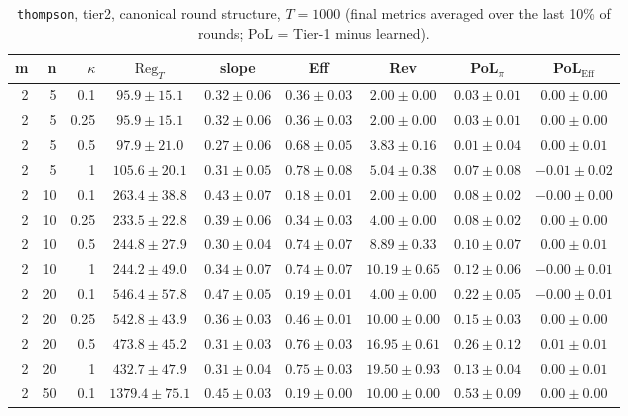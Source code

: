 \begin{table}[htbp]
\centering
\scriptsize
\caption{\texttt{thompson}, tier2, canonical round structure, $T=1000$ (final metrics averaged over the last 10\% of rounds; PoL = Tier-1 minus learned).}
\label{tab:tier2_thompson_canonical}
\begin{tabular}{@{}rrrcccccc@{}}
\toprule
m & n & $\kappa$ & $\mathrm{Reg}_T$ & slope & Eff & Rev & PoL$_\pi$ & PoL$_\mathrm{Eff}$ \\
\midrule
2 & 5 & 0.1 & $95.9 \pm 15.1$ & $0.32 \pm 0.06$ & $0.36 \pm 0.03$ & $2.00 \pm 0.00$ & $0.03 \pm 0.01$ & $0.00 \pm 0.00$ \\
2 & 5 & 0.25 & $95.9 \pm 15.1$ & $0.32 \pm 0.06$ & $0.36 \pm 0.03$ & $2.00 \pm 0.00$ & $0.03 \pm 0.01$ & $0.00 \pm 0.00$ \\
2 & 5 & 0.5 & $97.9 \pm 21.0$ & $0.27 \pm 0.06$ & $0.68 \pm 0.05$ & $3.83 \pm 0.16$ & $0.01 \pm 0.04$ & $0.00 \pm 0.01$ \\
2 & 5 & 1 & $105.6 \pm 20.1$ & $0.31 \pm 0.05$ & $0.78 \pm 0.08$ & $5.04 \pm 0.38$ & $0.07 \pm 0.08$ & $-0.01 \pm 0.02$ \\
2 & 10 & 0.1 & $263.4 \pm 38.8$ & $0.43 \pm 0.07$ & $0.18 \pm 0.01$ & $2.00 \pm 0.00$ & $0.08 \pm 0.02$ & $-0.00 \pm 0.00$ \\
2 & 10 & 0.25 & $233.5 \pm 22.8$ & $0.39 \pm 0.06$ & $0.34 \pm 0.03$ & $4.00 \pm 0.00$ & $0.08 \pm 0.02$ & $0.00 \pm 0.00$ \\
2 & 10 & 0.5 & $244.8 \pm 27.9$ & $0.30 \pm 0.04$ & $0.74 \pm 0.07$ & $8.89 \pm 0.33$ & $0.10 \pm 0.07$ & $0.00 \pm 0.01$ \\
2 & 10 & 1 & $244.2 \pm 49.0$ & $0.34 \pm 0.07$ & $0.74 \pm 0.07$ & $10.19 \pm 0.65$ & $0.12 \pm 0.06$ & $-0.00 \pm 0.01$ \\
2 & 20 & 0.1 & $546.4 \pm 57.8$ & $0.47 \pm 0.05$ & $0.19 \pm 0.01$ & $4.00 \pm 0.00$ & $0.22 \pm 0.05$ & $-0.00 \pm 0.01$ \\
2 & 20 & 0.25 & $542.8 \pm 43.9$ & $0.36 \pm 0.03$ & $0.46 \pm 0.01$ & $10.00 \pm 0.00$ & $0.15 \pm 0.03$ & $0.00 \pm 0.00$ \\
2 & 20 & 0.5 & $473.8 \pm 45.2$ & $0.31 \pm 0.03$ & $0.76 \pm 0.03$ & $16.95 \pm 0.61$ & $0.26 \pm 0.12$ & $0.01 \pm 0.01$ \\
2 & 20 & 1 & $432.7 \pm 47.9$ & $0.31 \pm 0.04$ & $0.75 \pm 0.03$ & $19.50 \pm 0.93$ & $0.13 \pm 0.04$ & $0.00 \pm 0.01$ \\
2 & 50 & 0.1 & $1379.4 \pm 75.1$ & $0.45 \pm 0.03$ & $0.19 \pm 0.00$ & $10.00 \pm 0.00$ & $0.53 \pm 0.09$ & $0.00 \pm 0.00$ \\

\end{tabular}
\end{table}
